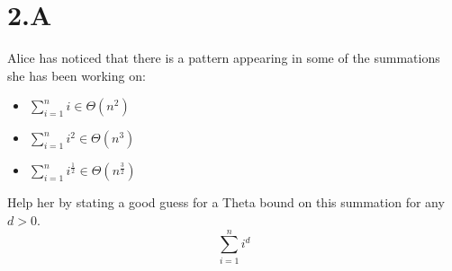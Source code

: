 \section{2.A}
    Alice has noticed that there is a pattern appearing in some of the summations she has been working on:
\begin{itemize}
\item $\sum_{i=1}^{n}i \in \Theta\left(n^2\right)$
\item $\sum_{i=1}^{n}i^2 \in \Theta\left(n^3\right)$
\item $\sum_{i=1}^{n}i^{\frac{1}{2}} \in \Theta\left(n^{\frac{3}{2}}\right)$
\end{itemize}

Help her by stating a good guess for a Theta bound on this summation for any $d>0$.
\[
\sum_{i=1}^ni^d
\]